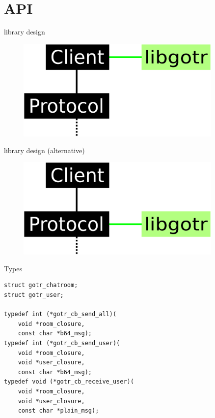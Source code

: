 \section{API}

\begin{frame}{library design}
	\begin{figure}
		\centering
		\includegraphics[width = 0.9\textwidth]{./abbildungen/arch_client.eps}
	\end{figure}
\end{frame}

\begin{frame}{library design (alternative)}
	\begin{figure}
		\centering
		\includegraphics[width = 0.9\textwidth]{./abbildungen/arch_prot.eps}
	\end{figure}
\end{frame}

\lstset{language=C}
\begin{frame}[fragile]{Types}
	\begin{lstlisting}
struct gotr_chatroom;
struct gotr_user;

typedef int (*gotr_cb_send_all)(
    void *room_closure,
    const char *b64_msg);
typedef int (*gotr_cb_send_user)(
    void *room_closure,
    void *user_closure,
    const char *b64_msg);
typedef void (*gotr_cb_receive_user)(
    void *room_closure,
    void *user_closure,
    const char *plain_msg);
	\end{lstlisting}
\end{frame}

